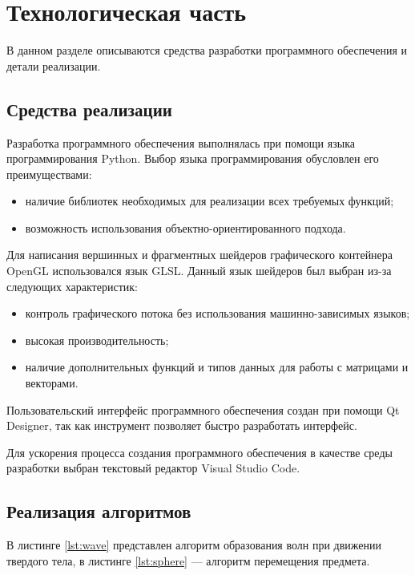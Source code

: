 \chapter{Технологическая часть}

В данном разделе описываются средства разработки программного обеспечения и детали реализации.

\section{Средства реализации}

Разработка программного обеспечения выполнялась при помощи языка программирования Python. Выбор языка программирования обусловлен его преимуществами:

\begin{itemize}
	\item наличие библиотек необходимых для реализации всех требуемых функций;
	\item возможность использования объектно-ориентированного подхода.
\end{itemize}

Для написания вершинных и фрагментных шейдеров графического контейнера OpenGL использовался язык GLSL. Данный язык шейдеров был выбран из-за следующих характеристик:

\begin{itemize}
	\item контроль графического потока без использования машинно-зависимых языков;
	\item высокая производительность;
	\item наличие дополнительных функций и типов данных для работы с матрицами и векторами.
\end{itemize}

Пользовательский интерфейс программного обеспечения создан при помощи Qt Designer, так как инструмент позволяет быстро разработать интерфейс.

Для ускорения процесса создания программного обеспечения в качестве среды разработки выбран текстовый редактор Visual Studio Code.

\section{Реализация алгоритмов}

В листинге \ref{lst:wave} представлен алгоритм образования волн при движении твердого тела, в листинге \ref{lst:sphere} --- алгоритм перемещения предмета.

